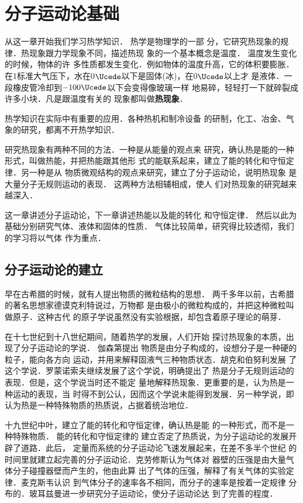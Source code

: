 \chapter{分子运动论基础}\label{chapter-foundations-of-molecular-kinematics}

从这一章开始我们学习热学知识．
热学是物理学的一部
分，它研究热现象的规律．热现象跟力学现象不同，描述热现
象的一个基本概念是温度．
温度发生变化的时候，物体的许
多性质都发生变化．例如物体的温度升高，它的体积要膨胀．
在1标准大气压下，水在0$\Ucede$以下是固体(冰)，在0$\Ucede$以上才
是液体．一段橡皮管冷却到$-100 \Ucede$以下会变得像玻璃一样
地易碎，轻轻打一下就碎裂成许多小块．凡是跟温度有关的
现象都叫做\textbf{热现象}．

热学知识在实际中有重要的应用．各种热机和制冷设备
的研制，化工、冶金、气象的研究，都离不开热学知识．

研究热现象有两种不同的方法．一种是从能量的观点来
研究，确认热是能的一种形式，叫做热能，并把热能跟其他形
式的能联系起来，建立了能的转化和守恒定律．另一种是从
物质微观结构的观点来研究，建立了分子运动论，说明热现象
是大量分子无规则运动的表现．
这两种方法相辅相成，使人
们对热现象的研究越来越深入．

这一章讲述分子运动论，下一章讲述热能以及能的转化
和守恒定律．
然后以此为基础分别研究气体、液体和固体的性质．
气体比较简单，研究得比较透彻，我们的学习将以气体
作为重点．

\section{分子运动论的建立}
    早在古希腊的时候，就有人提出物质的微粒结构的思想．
两千多年以前，古希腊的著名思想家德谟克利特说过，万物都
是由极小的微粒构成的，并把这种微粒叫做原子．这种古代
的原子学说虽然没有实验根据，却包含着原子理论的萌芽．

    在十七世纪到十八世纪期间，随着热学的发展，人们开始
探讨热现象的本质，出现了分子运动论的学说．
伽森第提出
物质是由分子构成的，设想分子是一种硬的粒子，能向各方向
运动，并用来解释固液气三种物质状态．胡克和伯努利发展
了这个学说．罗蒙诺索夫继续发展了这个学说，明确提出了
热是分子无规则运动的表现．但是，这个学说当时还不能定
量地解释热现象．更重要的是，认为热是一种运动的表现，当
时得不到公认，因而这个学说未能得到发展．另一种学说，即
认为热是一种特殊物质的热质说，占据着统治地位．

   十九世纪中叶，建立了能的转化和守恒定律，确认热是能
的一种形式，而不是一种特殊物质．
能的转化和守恒定律的
建立否定了热质说，为分子运动论的发展开辟了道路．此后，
定量而系统的分子运动论飞速发展起来，在差不多半个世纪
的时间里就建立起完善的分子运动论．克劳修斯认为气体对
器壁的压强是由大量气体分子碰撞器壁而产生的，他由此算
出了气体的压强，解释了有关气体的实验定律．麦克斯韦认识
到气体分子的速率各不相同，而分子的速率是按着一定规律
分布的．玻耳兹曼进一步研究分子运动论，使分子运动论达
到了完善的程度．

